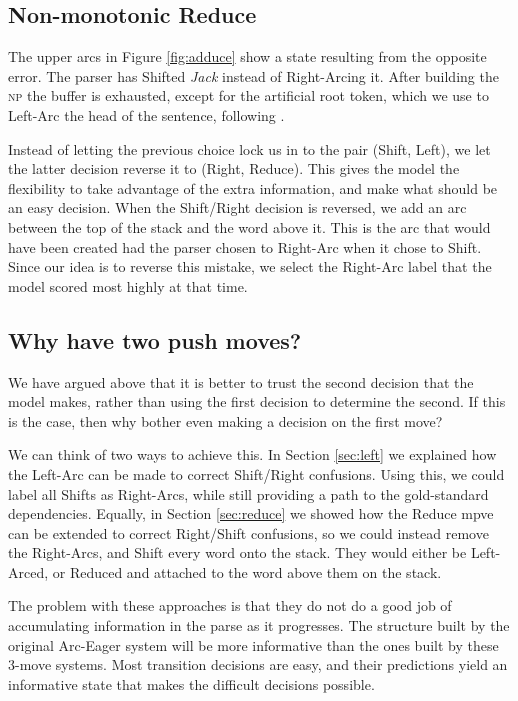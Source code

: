 \documentclass[11pt,letterpaper]{article}
\begin{document}
\subsection{Non-monotonic Reduce}

The upper arcs in Figure \ref{fig:adduce} show a state resulting from the opposite error.
The parser has Shifted \emph{Jack} instead of Right-Arcing it. After
building the \textsc{np} the buffer is exhausted, except for the artificial root token,
which we use to Left-Arc the head of the sentence, following \citet{nivre:squib}.

Instead of letting the previous choice lock us in to the pair (Shift, Left), we let
the latter decision reverse it to (Right, Reduce). This gives the model the flexibility
to take advantage of the extra information, and make what should be an easy decision.
When the Shift/Right decision is reversed, we add an arc between the top of the stack
and the word above it. This is the arc that would have been created had the parser
chosen to Right-Arc when it chose to Shift. Since our idea is to reverse this mistake,
we select the Right-Arc label that the model scored most highly at that time.


\subsection{Why have two push moves?}

We have argued above that it is better to trust the second decision that the model
makes, rather than using the first decision to determine the second. If this is
the case, then why bother even making a decision on the first move?

We can think of two ways to achieve this. 
In Section \ref{sec:left} we explained how the Left-Arc can be made to correct
Shift/Right confusions.  Using this, we could label all Shifts as Right-Arcs,
while still providing a path to the gold-standard dependencies. Equally, 
in Section \ref{sec:reduce} we showed how the Reduce
mpve can be extended to correct Right/Shift confusions, so we could instead
remove the Right-Arcs, and Shift every word onto the stack. They would either be
Left-Arced, or Reduced and attached to the word above them on the
stack.

The problem with these approaches is that they do not do a good job
of accumulating information in the parse as it progresses. The structure built by the
original Arc-Eager system will be more informative than the ones built by these
3-move systems. Most transition decisions are easy, and their predictions yield an
informative state that makes the difficult decisions possible.
\end{document}
